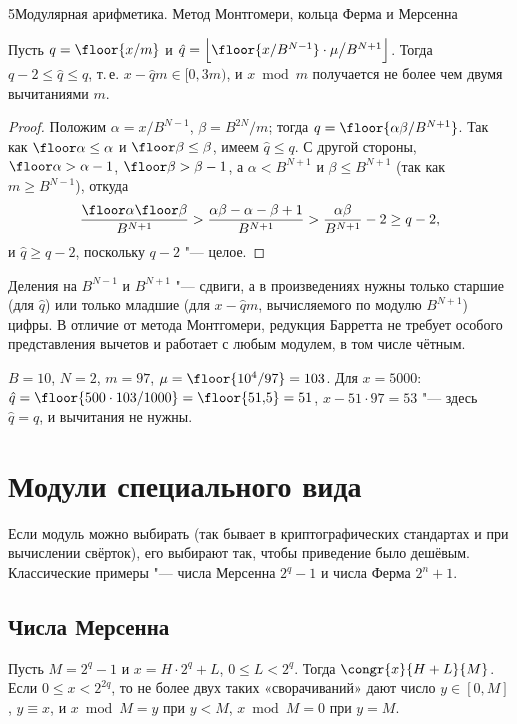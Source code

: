 \begin{lecture}{5}{Модулярная арифметика. Метод Монтгомери, кольца Ферма и Мерсенна}
\begin{proposition}\label{l5:barrett}
Пусть $q = \floor{x/m}$ и
$\hat q = \Bigl\lfloor \floor{x / B^{N-1}} \cdot \mu \big/ B^{N+1} \Bigr\rfloor$. Тогда
$q - 2 \le \hat q \le q$, т.\,е. $x - \hat q m \in [0, 3m)$, и $x \bmod m$ получается не более
чем двумя вычитаниями $m$.
\end{proposition}

\begin{proof}
Положим $\alpha = x / B^{N-1}$, $\beta = B^{2N}/m$; тогда $q = \floor{\alpha\beta/B^{N+1}}$.
Так как $\floor\alpha \le \alpha$ и $\floor\beta \le \beta$, имеем $\hat q \le q$. С другой
стороны, $\floor\alpha > \alpha - 1$, $\floor\beta > \beta - 1$, а $\alpha < B^{N+1}$ и
$\beta \le B^{N+1}$ (так как $m \ge B^{N-1}$), откуда
\[
  \frac{\floor\alpha \floor\beta}{B^{N+1}} > \frac{\alpha\beta - \alpha - \beta + 1}{B^{N+1}}
  > \frac{\alpha\beta}{B^{N+1}} - 2 \ge q - 2,
\]
и $\hat q \ge q - 2$, поскольку $q - 2$ "--- целое.
\end{proof}

Деления на $B^{N-1}$ и $B^{N+1}$ "--- сдвиги, а в произведениях нужны только старшие (для
$\hat q$) или только младшие (для $x - \hat q m$, вычисляемого по модулю $B^{N+1}$) цифры.
В отличие от метода Монтгомери, редукция Барретта не требует особого представления
вычетов и работает с любым модулем, в том числе чётным.

\begin{example}
$B = 10$, $N = 2$, $m = 97$, $\mu = \floor{10^4/97} = 103$. Для $x = 5000$:
$\hat q = \floor{500 \cdot 103 / 1000} = \floor{51{,}5} = 51$, $x - 51 \cdot 97 = 53$ "---
здесь $\hat q = q$, и вычитания не нужны.
\end{example}

\section{Модули специального вида}

Если модуль можно выбирать (так бывает в криптографических стандартах и при вычислении
свёрток), его выбирают так, чтобы приведение было дешёвым. Классические примеры "--- числа
Мерсенна $2^q - 1$ и числа Ферма $2^n + 1$.

\subsection{Числа Мерсенна}

\begin{proposition}\label{l5:mersenne-red}
Пусть $M = 2^q - 1$ и $x = H \cdot 2^q + L$, $0 \le L < 2^q$. Тогда $\congr{x}{H + L}{M}$.
Если $0 \le x < 2^{2q}$, то не более двух таких «сворачиваний» дают число $y \in [0, M]$,
$y \equiv x$, и $x \bmod M = y$ при $y < M$, $x \bmod M = 0$ при $y = M$.
\end{proposition}


\end{lecture}
